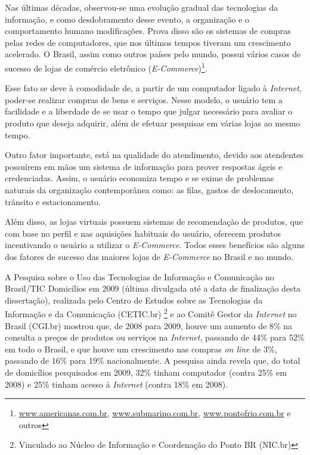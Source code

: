 Nas últimas décadas, observou-se uma evolução gradual das tecnologias da informação, e como desdobramento desse evento, a organização e o comportamento humano  modificações. 
Prova disso são os sistemas de compras pelas redes de computadores, que nos últimos tempos tiveram um crescimento acelerado. 
O Brasil, assim como outros países pelo mundo, possui vários casos de sucesso
de lojas de comércio eletrônico (\textit{E-Commerce})\footnote{\url{www.americanas.com.br}, \url{www.submarino.com.br}, \url{www.pontofrio.com.br} e outros}.

Esse fato se deve à comodidade de, a partir de um computador ligado à \textit{Internet},  poder-se realizar compras de bens e serviços.  
Nesse modelo, o usuário tem a facilidade e a liberdade de se usar o tempo que julgar necessário para avaliar o produto que deseja adquirir, além de efetuar pesquisas em várias lojas ao mesmo tempo.

Outro fator importante, está na qualidade do atendimento, devido aos atendentes possuírem em mãos um sistema de informação para prover respostas ágeis e credenciadas. Assim, o usuário economiza tempo e se exime de problemas naturais da organização contemporânea como: as filas, gastos de deslocamento, trânsito e estacionamento.

Além disso, as lojas virtuais possuem sistemas de recomendação de produtos, que com base no perfil e nas aquisições habituais do usuário, oferecem produtos incentivando o usuário a utilizar o \textit{E-Commerce}.  Todos esses benefícios são alguns dos fatores de sucesso
das maiores lojas de \textit{E-Commerce} no Brasil e no mundo.

A Pesquisa sobre o Uso das Tecnologias de Informação
e Comunicação no Brasil/TIC Domicílios em 2009 (última divulgada até a data de finalização desta dissertação)\cite{tic2009},
realizada pelo Centro de Estudos sobre as Tecnologias da Informação e da Comunicação (CETIC.br)
\footnote{Vinculado ao Núcleo de Informação e Coordenação do Ponto BR (NIC.br)}
e ao Comitê Gestor da \textit{Internet} no Brasil (CGI.br)
mostrou que, de 2008 para 2009, houve um aumento de 8\% na consulta a preços de produtos ou serviços na \textit{Internet},
passando de 44\% para 52\% em todo o Brasil, e que houve um crescimento nas compras \textit{on line} de 3\%,
passando de 16\% para 19\% nacionalmente.
A pesquisa ainda revela que, do total de domicílios pesquisados em 2009,
32\% tinham computador (contra 25\% em 2008) e 25\% tinham acesso à \textit{Internet} (contra 18\% em 2008).

